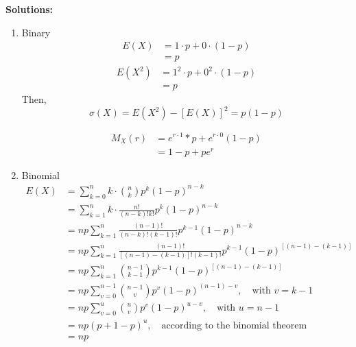 \documentclass[UTF8]{article}
\begin{document}
    \textbf{Solutions:}
    \begin{enumerate}
        \item Binary
            \begin{equation*}
                \begin{split}
                    E(X) &= 1\cdot p+0\cdot(1-p)\\
                    &=p                    
                \end{split}            
            \end{equation*}
            \begin{equation*}
                \begin{split}
                    E(X^2) &= 1^2\cdot p+0^2\cdot(1-p)\\
                    &= p
                \end{split}
            \end{equation*}
        Then, 
            \begin{equation*}
                \sigma(X)=E(X^2)-[E(X)]^2=p(1-p)
            \end{equation*}
            
            \begin{equation*}
                \begin{split}
                    M_X(r) &= e^{r\cdot1}*p+e^{r\cdot0}(1-p)\\
                    &=1-p+pe^r
                \end{split}
            \end{equation*}
        \item Binomial
            \begin{equation*}
                \begin{split}
                    E(X) &=\sum^n_{k=0}k\cdot\binom{n}{k}p^k(1-p)^{n-k}\\
                    &=\sum^n_{k=1}k\cdot\frac{n!}{(n-k)!k!}p^k(1-p)^{n-k}\\
                    &=np\sum^n_{k=1}\frac{(n-1)!}{(n-k)!(k-1)!}p^{k-1}(1-p)^{n-k}\\
                    &=np\sum^{n}_{k=1}\frac{(n-1)!}{[(n-1)-(k-1)]!(k-1)!}p^{k-1}(1-p)^{[(n-1)-(k-1)]}\\
                    &=np\sum^{n}_{k=1}\binom{n-1}{k-1}p^{k-1}(1-p)^{[(n-1)-(k-1)]}\\
                    &=np\sum^{n-1}_{v=0}\binom{n-1}{v}p^v(1-p)^{(n-1)-v},\quad\text{with $v=k-1$}\\
                    &=np\sum^{u}_{v=0}\binom{u}{v}p^v(1-p)^{u-v},\quad\text{with $u=n-1$}\\
                    &=np(p+1-p)^u,\quad\text{according to the binomial theorem }\\
                    &=np
                \end{split}
            \end{equation*}


\end{enumerate}
\end{document}
